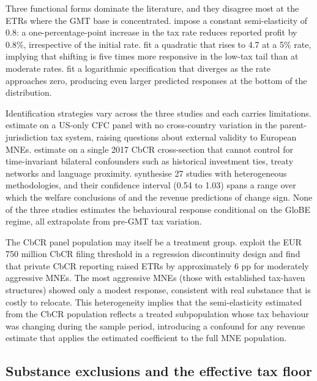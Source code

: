 \documentclass[11pt,a4paper]{article}
\begin{document}
Three functional forms dominate the literature, and they disagree most at the ETRs where the GMT base is concentrated. \citet{heckemeyer2017} impose a constant semi-elasticity of 0.8: a one-percentage-point increase in the tax rate reduces reported profit by 0.8\%, irrespective of the initial rate. \citet{dowd2017} fit a quadratic that rises to 4.7 at a 5\% rate, implying that shifting is five times more responsive in the low-tax tail than at moderate rates. \citet{garcia-bernardo2024} fit a logarithmic specification that diverges as the rate approaches zero, producing even larger predicted responses at the bottom of the distribution. 

Identification strategies vary across the three studies and each carries limitations. \citet{dowd2017} estimate on a US-only CFC panel with no cross-country variation in the parent-jurisdiction tax system, raising questions about external validity to European MNEs. \citet{garcia-bernardo2024} estimate on a single 2017 CbCR cross-section that cannot control for time-invariant bilateral confounders such as historical investment ties, treaty networks and language proximity. \citet{heckemeyer2017} synthesise 27 studies with heterogeneous methodologies, and their confidence interval (0.54 to 1.03) spans a range over which the welfare conclusions of \citet{johannesen2022} and the revenue predictions of \citet{vantriet2025} change sign. None of the three studies estimates the behavioural response conditional on the GloBE regime, all extrapolate from pre-GMT tax variation.

The CbCR panel population may itself be a treatment group. \citet{tuinsma2025} exploit the EUR 750 million CbCR filing threshold in a regression discontinuity design and find that private CbCR reporting raised ETRs by approximately 6 pp for moderately aggressive MNEs. The most aggressive MNEs (those with established tax-haven structures) showed only a modest response, consistent with real substance that is costly to relocate. This heterogeneity implies that the semi-elasticity estimated from the CbCR population reflects a treated subpopulation whose tax behaviour was changing during the sample period, introducing a confound for any revenue estimate that applies the estimated coefficient to the full MNE population.

\subsection{Substance exclusions and the effective tax floor}\label{sec:substance_lit}
\end{document}
